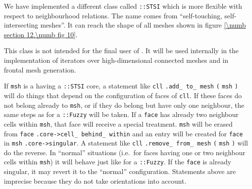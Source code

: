 We have implemented a different class called {\small\tt{}::STSI} which is more
flexible with respect to neighbourhood relations.
The name comes from ``self-touching, self-intersecting meshes''.
It can reach the shape of all meshes shown in figure \ref{\numb section 12.\numb fig 10}.

This class is not intended for the final user of \maniFEM.
It will be used internally in the implementation of iterators over high-dimensional connected meshes
and in frontal mesh generation.

If {\small\tt msh} is a {\small\tt{}} having a {\small\tt{}::STSI} core,
a statement like
{\small\tt cll} {\small\tt .add\_\,to\_\,mesh} {\small\tt (} {\small\tt msh} {\small\tt )}
will do things that depend on the configuration of faces of {\small\tt cll}.
If these faces do not belong already to {\small\tt msh}, or if they do belong but have only one
neighbour, the same steps as for a {\small\tt{}::Fuzzy} will be taken.%
If a {\small\tt face} has already two neighbour cells within {\small\tt msh}, that face will receive
a special treatment.
{\small\tt msh} will be erased from {\small\tt face} {\small\tt .core->cell\_\,behind\_\,within}
and an entry will be created for {\small\tt face} in {\small\tt msh} {\small\tt .core->singular}.
A statement like {\small\tt cll} {\small\tt .remove\_\,from\_\,mesh} {\small\tt (} {\small\tt msh}
{\small\tt )} will do the reverse.
In ``normal'' situations (i.e.\ for faces having one or two neighbour cells within {\small\tt msh})
it will behave just like for a {\small\tt{}::Fuzzy}.
If the {\small\tt face} is already singular, it may revert it to the ``normal'' configuration.
Statements above are imprecise because they do not take orientations into account.

